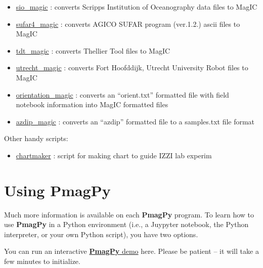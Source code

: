 \documentclass[11pt]{book}
\begin{document}
{{\begin{itemize}
\begin{itemize}
\item \href{https://pmagpy.github.io/PmagPy_MagIC.html#sio_magic}{sio\_magic} : converts Scripps Institution of Oceanography data files to MagIC
\item \href{https://pmagpy.github.io/PmagPy_MagIC.html#sufar4_magic}{sufar4\_magic} : converts AGICO SUFAR program (ver.1.2.) ascii files to MagIC
\item \href{https://pmagpy.github.io/PmagPy_MagIC.html#tdt_magic}{tdt\_magic} : converts Thellier Tool files to MagIC
\item \href{https://pmagpy.github.io/PmagPy_MagIC.html#utrecht_magic}{utrecht\_magic} : converts Fort Hoofddijk, Utrecht University Robot files to MagIC
\item \href{https://pmagpy.github.io/PmagPy_MagIC.html#orientation_magic}{orientation\_magic} : converts an ``orient.txt'' formatted file with field notebook information into MagIC formatted files
\item \href{https://pmagpy.github.io/PmagPy_MagIC.html#azdip_magic}{azdip\_magic} : converts an ``azdip'' formatted file to a samples.txt file format

  \end{itemize}

\end{itemize}

Other handy scripts:

\begin{itemize}

  \item \href{https://pmagpy.github.io/PmagPy_MagIC.html#chartmaker}{chartmaker} : script for making chart to guide IZZI lab experim

  \end{itemize}


\section{Using PmagPy}

Much more information is available on each {\bf PmagPy} program.  To learn how to use {\bf PmagPy} in a Python environment (i.e., a Juypyter notebook, the Python interpreter, or your own Python script), you have two options.

You can run an interactive \href{https://mybinder.org/v2/gh/PmagPy/PmagPy-notebooks/master?filepath=PmagPy.ipynb}{{\bf PmagPy} demo} here.  Please be patient -- it will take a few minutes to initialize.

}}
\end{document}
